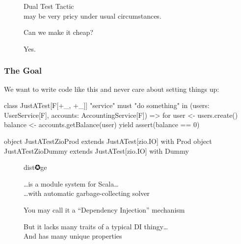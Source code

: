 \documentclass[usenames,dvipsnames]{beamer}
\begin{document}
\begin{frame}
  \begin{figure}
  \huge Dual Test Tactic \\
  may be very pricy under usual circumstances.
  \end{figure}
\end{frame}

\begin{frame}
  \begin{figure}
  \Huge Can we make it cheap?           
  \end{figure}
\end{frame}

\begin{frame}
  \begin{figure}
  \Huge Yes.
  \end{figure}
\end{frame}


\begin{frame}[fragile]
\frametitle{The Goal}

We want to write code like this and never care about setting things up:

\begin{scalacode}
class JustATest[F[+_, +_]] {
  "service" must {
    "do something" in {
      (users: UserService[F], accounts: AccountingService[F]) =>
      for {
        user  <- users.create()
        balance <- accounts.getBalance(user)
      } yield {
        assert(balance == 0)
      }
    }
  }
}

object JustATestZioProd extends JustATest[zio.IO] with Prod
object JustATestZioDummy extends JustATest[zio.IO] with Dummy
\end{scalacode}
\end{frame}

\begin{frame}
  \begin{figure}
  \Huge \color{RubineRed} dist✪ge
  \end{figure}

  \begin{figure}

  \huge \dots is a module system for Scala\dots \\
  \Large \dots with automatic garbage-collecting solver
  \end{figure}

  \begin{figure}
  \large You may call it a ``Dependency Injection'' mechanism
  \end{figure}

  \begin{figure}
  \large But it lacks many traits of a typical DI thingy\dots \\
  And has many unique properties
  \end{figure}
\end{frame}
\end{document}

